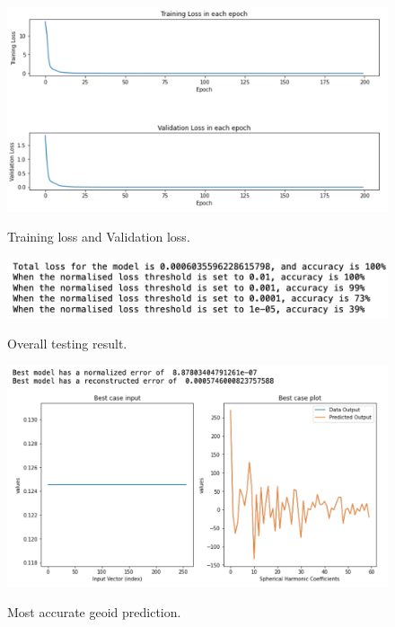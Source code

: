 \begin{figure}[H]
    \caption{Training loss and Validation loss.}
    \includegraphics[scale=0.6]{figures/geoid_images/Geoid_trainingData.png}
    \label{figure:geoid_losses}
\end{figure}

\begin{figure}[H]
    \caption{Overall testing result.}
    \includegraphics[scale=0.8]{figures/geoid_images/Geoid_OverallTesting.png}
    \label{figure:geoid_testing}
\end{figure}

\begin{figure}[H]
    \caption{Most accurate geoid prediction.}
    \includegraphics[scale=0.6]{figures/geoid_images/Geoid_Best.png}
    \label{figure:geoid_best}
\end{figure}

